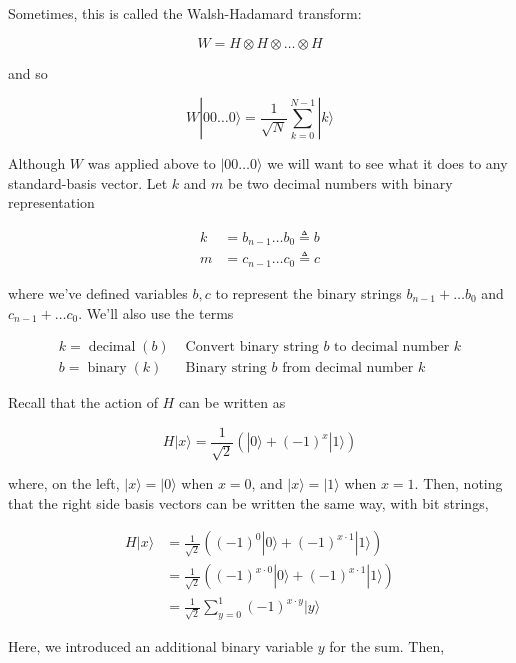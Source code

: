 \documentclass[main.tex]{subfiles}
\begin{document}
    Sometimes, this is called the Walsh-Hadamard transform:
    
    $$
    W=H \otimes H \otimes \ldots \otimes H
    $$
    
    and so
    
    $$
    W|00 \ldots 0\rangle=\frac{1}{\sqrt{N}} \sum_{k=0}^{N-1}|k\rangle
    $$
    
    Although $W$ was applied above to $|00 \ldots 0\rangle$ we will want to see what it does to any standard-basis vector. Let $k$ and $m$ be two decimal numbers with binary representation
    
    $$
    \begin{aligned}
    k &=b_{n-1} \ldots b_{0} \triangleq b \\
    m &=c_{n-1} \ldots c_{0} \triangleq c
    \end{aligned}
    $$
    
    where we've defined variables $b, c$ to represent the binary strings $b_{n-1}+\ldots b_{0}$ and $c_{n-1}+\ldots c_{0}$. We'll also use the terms
    
    $$
    \begin{array}{ll}
    k=\operatorname{decimal}(b) & \text { Convert binary string } b \text { to decimal number } k \\
    b=\operatorname{binary}(k) & \text { Binary string } b \text { from decimal number } k
    \end{array}
    $$
    
    Recall that the action of $H$ can be written as
    
    $$
    H|x\rangle=\frac{1}{\sqrt{2}}\left(|0\rangle+(-1)^{x}|1\rangle\right)
    $$
    
    where, on the left, $|x\rangle=|0\rangle$ when $x=0$, and $|x\rangle=|1\rangle$ when $x=1$. Then, noting that the right side basis vectors can be written the same way, with bit strings,
    
    $$
    \begin{aligned}
    H|x\rangle &=\frac{1}{\sqrt{2}}\left((-1)^{0}|0\rangle+(-1)^{x \cdot 1}|1\rangle\right) \\
    &=\frac{1}{\sqrt{2}}\left((-1)^{x \cdot 0}|0\rangle+(-1)^{x \cdot 1}|1\rangle\right) \\
    &=\frac{1}{\sqrt{2}} \sum_{y=0}^{1}(-1)^{x \cdot y}|y\rangle
    \end{aligned}
    $$
    
    Here, we introduced an additional binary variable $y$ for the sum. Then,
    
\end{document}
